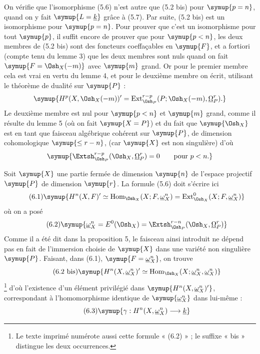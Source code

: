 On vérifie que l'isomorphisme (5.6) n'est autre que (5.2 bis) pour $\symup{p=n}$, quand
on y fait $\symup{L=\underline{k}}$ grâce à (5.7). Par suite, (5.2 bis) est un isomorphisme pour
$\symup{p=n}$. Pour prouver que c'est un isomorphisme pour tout $\symup{p}$, il suffit encore
de prouver que pour $\symup{p<n}$, les deux membres de (5.2 bis) sont des foncteurs
coeffaçables en $\symup{F}$, et a fortiori (compte tenu du lemme 3) que les deux membres
sont nuls quand on fait $\symup{F=\Osh_X(-m)}$ avec $\symup{m}$ grand. Or pour le premier
membre cela est vrai en vertu du lemme 4, et pour le deuxième membre on écrit,
utilisant le théorème de dualité sur $\symup{P}$ :
\[
  \symup{H^{p}(X,\Osh_X(-m))'
  =\operatorname{Ext}_{\Osh_P}^{r-p}
    (P;\Osh_X(-m),\underline{\Omega}_P^{r}).}
\]
Le deuxième membre est nul pour $\symup{p<n}$ et $\symup{m}$ grand, comme il résulte du lemme 5
(où on fait $\symup{X=P}$) et du fait que $\symup{\Osh_X}$ est en tant que faisceau algébrique
cohérent sur $\symup{P}$, de dimension cohomologique $\symup{\leq r-n}$, (car $\symup{X}$ est non
singulière) d'où
\[
  \symup{\Extsh_{\Osh_P}^{r-p}(\Osh_X,\underline{\Omega}_P^{r})=0
  \qquad\text{pour }p<n.}
\]


Soit $\symup{X}$ une partie fermée de dimension $\symup{n}$ de l'espace projectif $\symup{P}$ de
dimension $\symup{r}$. La formule (5.6) doit s'écrire ici
\begin{equation}\tag{6.1}
  \symup{H^{n}(X,F)'
  \simeq\operatorname{Hom}_{\Osh_X}(X;F,\underline{\omega}_X^{n})
  =\operatorname{Ext}_{\Osh_X}^{0}(X;F,\underline{\omega}_X^{n})}
\end{equation}
où on a posé
\begin{equation}\tag{6.2}
  \symup{\underline{\omega}_X^{n}=E^{0}(\Osh_X)
  =\Extsh_{\Osh_P}^{r-n}(\Osh_X,\underline{\Omega}_P^{r})}
\end{equation}
Comme il a été dit dans la proposition 5, le faisceau ainsi introduit ne dépend
pas en fait de l'immersion choisie de $\symup{X}$ dans une variété non singulière $\symup{P}$.
Faisant, dans (6.1), $\symup{F=\underline{\omega}_X^{n}}$, on trouve
\begin{equation}\tag{6.2 bis}
  \symup{H^{n}(X,\underline{\omega}_X^{n})'
  \simeq\operatorname{Hom}_{\Osh_X}(X;\underline{\omega}_X^{n},\underline{\omega}_X^{n})}
\end{equation}
\footnote{Le texte imprimé numérote aussi cette formule « (6.2) » ; le suffixe
« bis » distingue les deux occurrences.} d'où l'existence d'un élément
privilégié dans $\symup{H^{n}(X,\underline{\omega}_X^{n})'}$, correspondant à l'homomorphisme
identique de $\symup{\underline{\omega}_X^{n}}$ dans lui-même :
\begin{equation}\tag{6.3}
  \symup{\gamma:H^{n}(X,\underline{\omega}_X^{n})\longrightarrow\underline{k}}
\end{equation}

